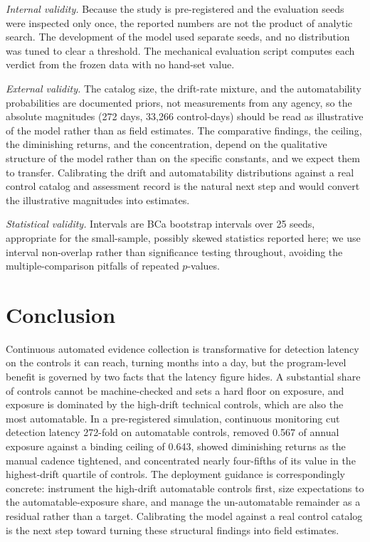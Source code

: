\documentclass[journal]{IEEEtran}
\begin{document}
\emph{Internal validity.} Because the study is pre-registered and the evaluation seeds were
inspected only once, the reported numbers are not the product of analytic search. The development
of the model used separate seeds, and no distribution was tuned to clear a threshold. The
mechanical evaluation script computes each verdict from the frozen data with no hand-set value.

\emph{External validity.} The catalog size, the drift-rate mixture, and the automatability
probabilities are documented priors, not measurements from any agency, so the absolute magnitudes
(272 days, 33{,}266 control-days) should be read as illustrative of the model rather than as field
estimates. The comparative findings, the ceiling, the diminishing returns, and the concentration,
depend on the qualitative structure of the model rather than on the specific constants, and we
expect them to transfer. Calibrating the drift and automatability distributions against a real
control catalog and assessment record is the natural next step and would convert the illustrative
magnitudes into estimates.

\emph{Statistical validity.} Intervals are BCa bootstrap intervals over 25 seeds, appropriate for
the small-sample, possibly skewed statistics reported here; we use interval non-overlap rather than
significance testing throughout, avoiding the multiple-comparison pitfalls of repeated $p$-values.

\section{Conclusion}
Continuous automated evidence collection is transformative for detection latency on the controls it
can reach, turning months into a day, but the program-level benefit is governed by two facts that
the latency figure hides. A substantial share of controls cannot be machine-checked and sets a hard
floor on exposure, and exposure is dominated by the high-drift technical controls, which are also
the most automatable. In a pre-registered simulation, continuous monitoring cut detection latency
272-fold on automatable controls, removed 0.567 of annual exposure against a binding ceiling of
0.643, showed diminishing returns as the manual cadence tightened, and concentrated nearly
four-fifths of its value in the highest-drift quartile of controls. The deployment guidance is
correspondingly concrete: instrument the high-drift automatable controls first, size expectations
to the automatable-exposure share, and manage the un-automatable remainder as a residual rather
than a target. Calibrating the model against a real control catalog is the next step toward turning
these structural findings into field estimates.
\end{document}
